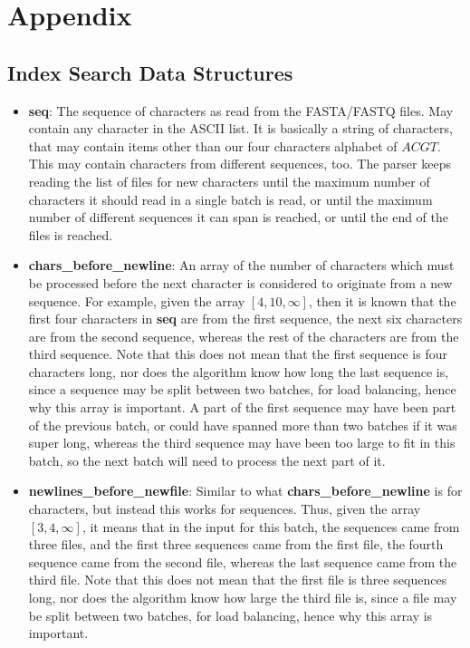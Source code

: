 \chapter{Appendix}

\section{Index Search Data Structures}\label{app:IndexSearchDataStructures}

\begin{itemize}
  \item \textbf{seq}: The sequence of characters as read from the FASTA/FASTQ files. May contain any character in the ASCII list. It is basically a string of characters, that may contain items other than our four characters alphabet of $ACGT$. This may contain characters from different sequences, too. The parser keeps reading the list of files for new characters until the maximum number of characters it should read in a single batch is read, or until the maximum number of different sequences it can span is reached, or until the end of the files is reached.
  \item \textbf{chars\_before\_newline}: An array of the number of characters which must be processed before the next character is considered to originate from a new sequence. For example, given the array $[4, 10, \infty]$, then it is known that the first four characters in \textbf{seq} are from the first sequence, the next six characters are from the second sequence, whereas the rest of the characters are from the third sequence. Note that this does not mean that the first sequence is four characters long, nor does the algorithm know how long the last sequence is, since a sequence may be split between two batches, for load balancing, hence why this array is important. A part of the first sequence may have been part of the previous batch, or could have spanned more than two batches if it was super long, whereas the third sequence may have been too large to fit in this batch, so the next batch will need to process the next part of it.
  \item \textbf{newlines\_before\_newfile}: Similar to what \textbf{chars\_before\_newline} is for characters, but instead this works for sequences. Thus, given the array $[3, 4, \infty]$, it means that in the input for this batch, the sequences came from three files, and the first three sequences came from the first file, the fourth sequence came from the second file, whereas the last sequence came from the third file. Note that this does not mean that the first file is three sequences long, nor does the algorithm know how large the third file is, since a file may be split between two batches, for load balancing, hence why this array is important.

\end{itemize}
